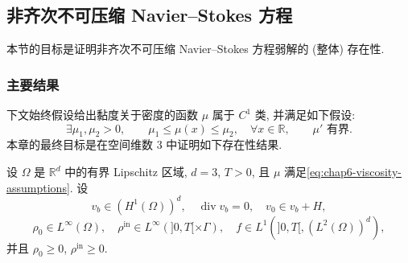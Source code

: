 \subsection{非齐次不可压缩 Navier--Stokes 方程}
\label{sec:chap6-nonhomogeneous-navier-stokes}
\renewcommand{\thestatement}{2.\arabic{statement}}
\renewcommand{\theHstatement}{ch06.sec02.\arabic{statement}}
\setcounter{statement}{0}
\renewcommand{\thechaptersixsectiontworemark}{2.\arabic{chaptersixsectiontworemark}}
\begin{sloppypar}

本节的目标是证明非齐次不可压缩 Navier--Stokes 方程弱解的 (整体) 存在性.

\subsubsection{主要结果}
\label{subsec:chap6-main-result}

下文始终假设给出黏度关于密度的函数 $\mu$ 属于 $C^1$ 类, 并满足如下假设:
\begin{equation}
 \exists\mu_1,\mu_2>0,\qquad
 \mu_1\leq\mu(x)\leq\mu_2,\quad\forall x\in\mathbb R,
 \qquad\mu'\text{ 有界}.
\label{eq:chap6-viscosity-assumptions}
\end{equation}
本章的最终目标是在空间维数 $3$ 中证明如下存在性结果.

\begin{Theorem}[弱解的存在性]
\label{thm:chap6-nonhomogeneous-weak-existence}
设 $\Omega$ 是 $\mathbb R^d$ 中的有界 Lipschitz 区域, $d=3$, $T>0$, 且 $\mu$ 满足\eqref{eq:chap6-viscosity-assumptions}. 设
\[
 v_b\in(H^1(\Omega))^d,\quad \operatorname{div}v_b=0,\quad
 v_0\in v_b+H,
\]
\[
 \rho_0\in L^\infty(\Omega),\quad
 \rho^{\mathrm{in}}\in L^\infty(]0,T[\times\Gamma),\quad
 f\in L^1(]0,T[,(L^2(\Omega))^d),
\]
并且 $\rho_0\geq0$, $\rho^{\mathrm{in}}\geq0$.


\end{Theorem}
\end{sloppypar}
